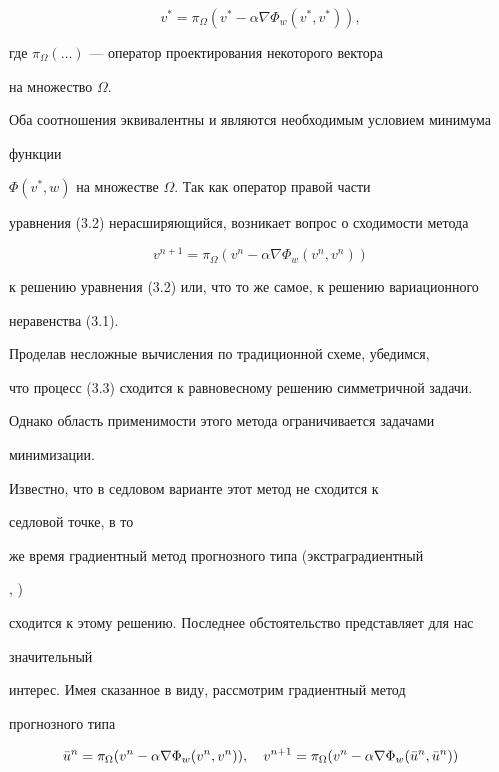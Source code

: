 \begin{equation}


v^*=\pi_\Omega(v^*-\alpha\nabla\Phi_w(v^*,v^*)),


\end{equation}


где $\pi_\Omega(\dotsc)$ --- оператор проектирования некоторого вектора


на множество $\Omega$.


Оба соотношения эквивалентны и являются необходимым условием минимума


функции


$\Phi(v^*,w)$ на множестве $\Omega$. Так как оператор правой части


уравнения (3.2) нерасширяющийся, возникает вопрос о сходимости метода


\begin{equation}


v^{n+1}=\pi_\Omega(v^n-\alpha\nabla\Phi_w(v^n,v^n))


\end{equation}


к решению уравнения (3.2) или, что то же самое, к решению вариационного


неравенства (3.1).





Проделав несложные вычисления по традиционной схеме, убедимся,


что процесс (3.3) сходится к равновесному решению симметричной задачи.


Однако область применимости этого метода ограничивается задачами


минимизации.


Известно, что в седловом варианте \cite{A4} этот метод не сходится к


седловой точке, в то


же время градиентный метод прогнозного типа (экстраградиентный


\cite{Kor}, \cite{A5})


сходится к этому решению. Последнее обстоятельство представляет для нас


значительный


интерес. Имея сказанное в виду, рассмотрим градиентный метод


прогнозного типа


\begin{equation}


\Bar u^n=\pi_\Omega(v^n-\alpha\nabla\Phi_w(v^n,v^n)),\quad


v^{n+1}=\pi_\Omega(v^n-\alpha\nabla\Phi_w(\Bar u^n,\Bar u^n))


\end{equation}


